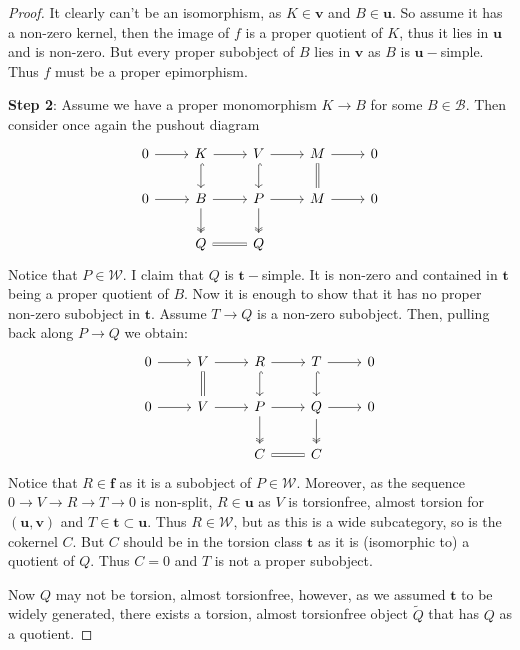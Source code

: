 \documentclass[11pt]{amsart}
\theoremstyle{definition}
\newcommand{\B}{\mathcal B}
\newcommand{\tpair}[2]{(\mathbf{#1}, \mathbf{#2})  }
\begin{document}
\begin{proof}
It clearly can't be an isomorphism, as \( K \in \mathbf{v} \) and \( B \in \mathbf{u} \). So assume it has a non-zero kernel, then the image of \( f \) is a proper quotient of \( K \), thus it lies in \( \mathbf{u} \) and is non-zero. But every proper subobject of \( B \) lies in \( \mathbf{v} \) as \( B \) is \( \mathbf{u}-\)simple. Thus \( f \) must be a proper epimorphism. 

\noindent \textbf{Step 2}: Assume we have a proper monomorphism \( K \to B \) for some \( B \in \B \). Then consider once again the pushout diagram
\[
\begin{tikzcd}
0 \ar[r] & K \ar[r] \ar[d, hook] & V \ar[r] \ar[d, hook] & M \ar[r] \ar[d, equals] & 0 \\
0 \ar[r] & B \ar[d, two heads] \ar[r] & P \ar[d, two heads] \ar[r] & M \ar[r] & 0 \\
& Q \ar[r, equals] & Q
\end{tikzcd}
\]
Notice that \( P \in \mathcal{W} \). I claim that \( Q \) is \( \mathbf{t}-\)simple. It is non-zero and contained in \( \mathbf{t} \) being a proper quotient of \( B \). Now it is enough to show that it has no proper non-zero subobject in \( \mathbf{t} \). Assume \( T \to Q \) is a non-zero subobject. Then, pulling back along \( P \to Q \) we obtain:
\[
\begin{tikzcd}
0 \ar[r] & V \ar[r] \ar[d, equals] & R \ar[r] \ar[d, hook] & T \ar[r] \ar[d, hook] & 0 \\
0 \ar[r] & V  \ar[r] & P \ar[d, two heads] \ar[r] & Q \ar[r] \ar[d, two heads] & 0 \\
& & C \ar[r, equals] & C
\end{tikzcd}
\]
Notice that \( R \in \mathbf{f} \) as it is a subobject of  \(  P \in \mathcal{W} \). Moreover, as the sequence \( 0 \to V \to R \to T \to 0 \) is non-split, \( R \in \mathbf{u} \) as \( V \) is torsionfree, almost torsion for \( \tpair{u}{v} \) and \( T \in \mathbf{t} \subset \mathbf{u} \). Thus \( R \in \mathcal{W} \), but as this is a wide subcategory, so is the cokernel \( C \). But \( C \) should be in the torsion class \( \mathbf{t} \) as it is (isomorphic to) a quotient of \( Q \). Thus \( C = 0 \) and \( T \) is not a proper subobject. 

Now \( Q \) may not be torsion, almost torsionfree, however, as we assumed \( \mathbf{t} \) to be widely generated, there exists a torsion, almost torsionfree object \( \widetilde{Q} \) that has \( Q \) as a quotient. 


\end{proof}
\end{document}
